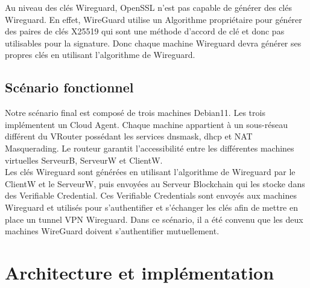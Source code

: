 \documentclass[12pt, openany]{report}
\begin{document}
\begin{flushleft}
\vspace{2mm}
Au niveau des clés Wireguard, OpenSSL n'est pas capable de générer des clés Wireguard. En effet, WireGuard utilise un Algorithme propriétaire pour générer des paires de clés X25519 qui sont une méthode d'accord de clé et donc pas utilisables pour la signature. Donc chaque machine Wireguard devra générer ses propres clés en utilisant l'algorithme de Wireguard.
\end{flushleft}

\subsection{Scénario fonctionnel}
\noindent
\begin{flushleft}
Notre scénario final est composé de trois machines Debian11. Les trois implémentent un Cloud Agent. Chaque machine appartient à un sous-réseau différent du VRouter possédant les services dnsmask, dhcp et NAT Masquerading. Le routeur garantit l'accessibilité entre les différentes machines virtuelles ServeurB, ServeurW et ClientW.\\
Les clés Wireguard sont générées en utilisant l'algorithme de Wireguard par le ClientW et le ServeurW, puis envoyées au Serveur Blockchain qui les stocke dans des Verifiable Credential. Ces Verifiable Credentials sont envoyés aux machines Wireguard et utilisés pour s'authentifier et s'échanger les clés afin de mettre en place un tunnel VPN Wireguard. Dans ce scénario, il a été convenu que les deux machines WireGuard doivent s'authentifier mutuellement.
\end{flushleft}

\section{Architecture et implémentation}
\end{document}
